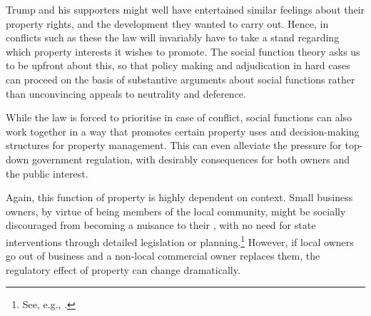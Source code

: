 Trump and his supporters might well have entertained similar feelings about their property rights, and the development they wanted to carry out. Hence, in conflicts such as these the law will invariably have to take a stand regarding which property interests it wishes to promote. The social function theory asks us to be upfront about this, so that policy making and adjudication in hard cases can proceed on the basis of substantive arguments about social functions rather than unconvincing appeals to neutrality and deference.

 
While the law is forced to prioritise in case of conflict, social functions can also work together in a way that promotes certain property uses and decision-making structures for property management. This can even alleviate the pressure for top-down government regulation, with desirably consequences for both owners and the public interest.



Again, this function of property is highly dependent on context. Small business owners, by virtue of being members of the local community, might be socially discouraged from becoming a nuisance to their , with no need for state interventions through detailed legislation or planning.\footnote{See, e.g., \cite[282-283]{ellickson91}.} However, if local owners go out of business and a non-local commercial owner replaces them, the regulatory effect of property can change dramatically. 

